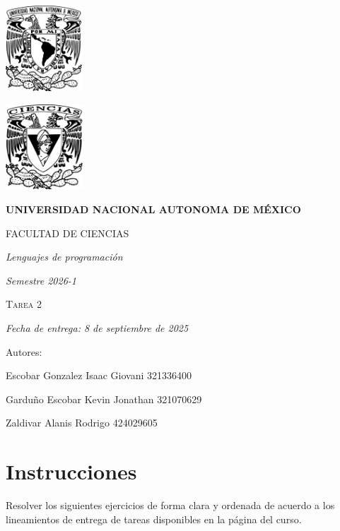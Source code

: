 \documentclass[11pt]{article}
\begin{document}
\begin{titlepage}
    \centering
    \vspace{2cm}
    {\includegraphics[height=3.2cm]{logo_unam.png}}
    \hfill
    {\includegraphics[height=3.2cm]{logo_fc.png}\par}
    \vspace{1cm}
    {\bfseries\LARGE UNIVERSIDAD NACIONAL AUTONOMA DE MÉXICO \par}
    \vspace{0.7cm}
    {\scshape\Large FACULTAD DE CIENCIAS \par}
    \vspace{1cm}
    {\itshape\Large Lenguajes de programación \par}
    \vspace{0.5cm}
    {\itshape\Large Semestre 2026-1 \par}
    \vspace{2cm}
    {\scshape\Huge Tarea 2 \par}
    \vspace{1cm}
    {\itshape\Large Fecha de entrega: 8 de septiembre de 2025 \par}
    \vspace{2cm}
    {\Large Autores: \par}
    \vspace{0.4cm}
    {\Large Escobar Gonzalez Isaac Giovani \hspace{1cm} 321336400 \par}
    {\Large Garduño Escobar Kevin Jonathan \hspace{0.5cm} 321070629 \par}
    {\Large Zaldivar Alanis Rodrigo \hspace{2.75cm} 424029605 \par}
\end{titlepage}
\section*{Instrucciones}
\noindent Resolver los siguientes ejercicios de forma clara y ordenada de acuerdo a los lineamientos de entrega de tareas disponibles en la página del curso.\\
\end{document}
